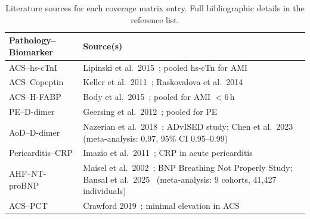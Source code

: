 \documentclass[times, twoside, watermark]{zHenriquesLab-StyleBioRxiv}
\begin{document}
\begin{table}[h]
\centering
\caption{Literature sources for each coverage matrix entry. Full bibliographic details in the reference list.}
\label{tab:sources}
\scriptsize
\begin{tabular}{@{}lp{14cm}@{}}
\toprule
\textbf{Pathology--Biomarker} & \textbf{Source(s)} \\
\midrule
ACS--hs-cTnI & Lipinski et al.\ 2015~\cite{Lipinski2015}; pooled hs-cTn for AMI \\
ACS--Copeptin & Keller et al.\ 2011~\cite{Keller2011}; Raskovalova et al.\ 2014~\cite{Raskovalova2013} \\
ACS--H-FABP & Body et al.\ 2015~\cite{Body2015}; pooled for AMI $<$6\,h \\
PE--D-dimer & Geersing et al.\ 2012~\cite{Geersing2012}; pooled for PE \\
AoD--D-dimer & Nazerian et al.\ 2018~\cite{Nazerian2014}; ADvISED study; Chen et al.\ 2023~\cite{Chen2023} (meta-analysis: 0.97, 95\% CI 0.95--0.99) \\
Pericarditis--CRP & Imazio et al.\ 2011~\cite{Imazio2011}; CRP in acute pericarditis \\
AHF--NT-proBNP & Maisel et al.\ 2002~\cite{Maisel2002}; BNP Breathing Not Properly Study; Bansal et al.\ 2025~\cite{Bansal2025} (meta-analysis: 9 cohorts, 41,427 individuals) \\
ACS--PCT & Crawford 2019~\cite{Crawford2019}; minimal elevation in ACS \\
\bottomrule
\end{tabular}
\end{table}



\end{document}
